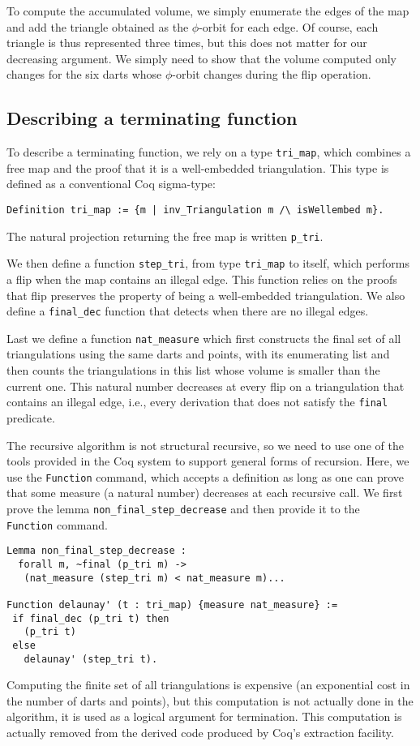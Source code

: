 \documentclass{llncs}
\begin{document}
To compute the accumulated volume, we simply enumerate the edges of the
map and add the triangle obtained as the \(\phi\)-orbit for each edge.
Of course, each triangle is thus represented three times, but this
does not matter for our decreasing argument.  We simply need to show that the
volume computed only changes for the six darts whose \(\phi\)-orbit
 changes during the flip operation.

\subsection{Describing a terminating function}
To describe a terminating function, we rely on a type {\tt tri\_map}, which
combines a free map and the proof that it is a well-embedded triangulation.
This type is defined as a conventional Coq sigma-type:
\begin{verbatim}
Definition tri_map := {m | inv_Triangulation m /\ isWellembed m}.
\end{verbatim}
The natural projection returning the free map is written
{\tt p\_tri}.

We then define a function {\tt step\_tri}, from type {\tt tri\_map} to itself,
which performs a flip when the map contains an illegal edge.  This
function relies on the proofs that 
flip preserves the property of being a well-embedded triangulation.
We also define a {\tt final\_dec} function that detects when
 there are no illegal edges.

Last we define a function {\tt nat\_measure} which first constructs 
the final set of all triangulations using
the same darts and points, with its enumerating list and then counts the
triangulations in this list whose volume is smaller than the current one.
This natural number decreases at every flip on a triangulation
that contains an illegal edge, i.e., every derivation that does not 
satisfy the {\tt final} predicate.

The recursive algorithm is not structural recursive, so we need to use
one of the tools provided in the Coq system to support general forms
of recursion.  Here, we use the {\tt Function} command, which accepts a
definition as long as one can prove that some measure (a natural
number) decreases at each recursive call.  We first prove the lemma
{\tt non\_final\_step\_decrease} and then provide it to the {\tt
  Function} command.
\begin{verbatim}
Lemma non_final_step_decrease :
  forall m, ~final (p_tri m) ->
   (nat_measure (step_tri m) < nat_measure m)...

Function delaunay' (t : tri_map) {measure nat_measure} :=
 if final_dec (p_tri t) then
   (p_tri t)
 else
   delaunay' (step_tri t).
\end{verbatim}
Computing the finite set of all triangulations is expensive (an
exponential cost in the number of darts and points), but this
computation is not actually done in the algorithm, it is used as a
logical argument for termination.  This computation is actually
removed from the derived code produced by Coq's extraction facility.
\end{document}
